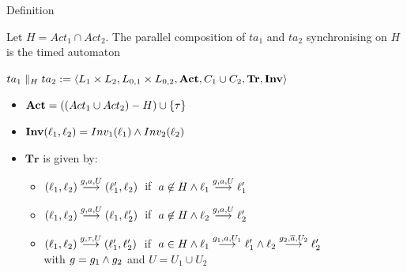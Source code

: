 \documentclass{beamer}
\begin{document}
\begin{slide}{Definition}

  Let $H = Act_1 \cap Act_2$. The parallel composition of
  $ta_1$ and $ta_2$ synchronising on $H$ is the timed automaton

  \vspace{0.2cm}
$ta_1 \parallel_H ta_2 := \mathopen{\langle}L_1 \times L_2, L_{0,1} \times L_{0,2}, 
\mathbf{Act}, C_1 \cup C_2, \mathbf{Tr}, 
\mathbf{Inv}\mathclose{\rangle}$

  \vspace{0.2cm}
\begin{itemize}
\item $\mathbf{Act} = ((Act_1 \cup Act_2) - H) \cup \mathopen{ \{ }\tau\mathclose{ \} }$
\item $\mathbf{Inv} (\ell_1,\ell_2) = Inv_1(\ell_1) \mathbin{\wedge}  Inv_2(\ell_2)$
\item $\mathbf{Tr}$ is given by:
\begin{itemize}
\item $(\ell_1,\ell_2) \stackrel{g,a,U}{\longrightarrow} (\ell'_1,\ell_2)\; $ if $\; a \not \in H \mathbin{\wedge}  \ell_1 \stackrel{g,a,U}{\longrightarrow} \ell'_1 $
\item $(\ell_1,\ell_2) \stackrel{g,a,U}{\longrightarrow} (\ell_1,\ell'_2)\; $ if $\; a \not \in H \mathbin{\wedge}   \ell_2 \stackrel{g,a,U}{\longrightarrow} \ell'_2$
\item $(\ell_1,\ell_2) \stackrel{g,\tau,U}{\longrightarrow} (\ell'_1,\ell'_2)\; $ if $\; a \in H \mathbin{\wedge}  \ell_1 \stackrel{g_1,a,U_1}{\longrightarrow} \ell'_1 \mathbin{\wedge} \ell_2 \stackrel{g_2,\overline{a},U_2}{\longrightarrow} \ell'_2$\\
with $g = g_1 \mathbin{\wedge} g_2$ and $U = U_1 \cup U_2$
\end{itemize}
\end{itemize}
\end{slide}
\end{document}
